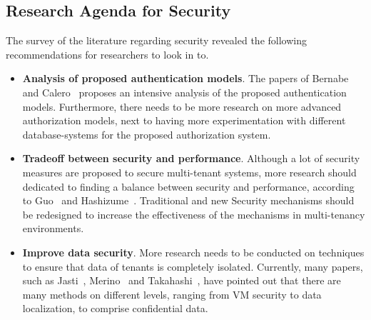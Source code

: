\subsection{Research Agenda for Security}\label{sec:security_agenda}
The survey of the literature regarding security revealed the following recommendations for researchers to look in to. 
\begin{itemize}
    \item \textbf{Analysis of proposed authentication models}.
        The papers of Bernabe~\cite{Bernabe2012Auth} and Calero~\cite{Calero2010Auth} proposes an intensive analysis of the proposed authentication models. Furthermore, there needs to be more research on more advanced authorization models, next to having more experimentation with different database-systems for the proposed authorization system.
    \item \textbf{Tradeoff between security and performance}.
        Although a lot of security measures are proposed to secure multi-tenant systems, more research should dedicated to finding a balance between security and performance, according to Guo~\cite{guo2007framework} and Hashizume~\cite{Hashizume2013Security}. Traditional and new Security mechanisms should be redesigned to increase the effectiveness of the mechanisms in multi-tenancy environments.
    \item \textbf{Improve data security}.
        More research needs to be conducted on techniques to ensure that data of tenants is completely isolated. Currently, many papers, such as Jasti~\cite{Jasti2010Security}, Merino~\cite{Merino2011Security} and Takahashi~\cite{Takahashi2012Security}, have pointed out that there are many methods on different levels, ranging from VM security to data localization, to comprise confidential data. 
\end{itemize}

